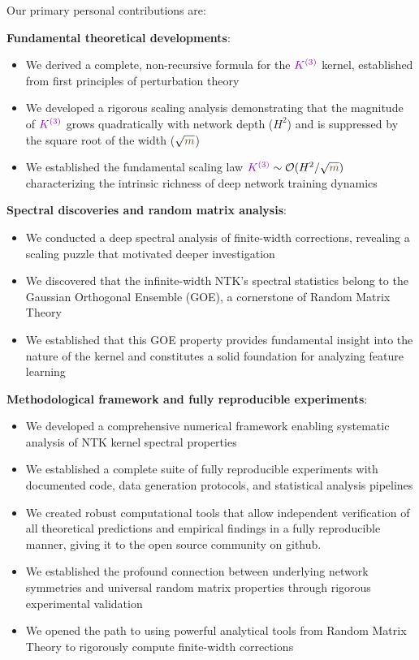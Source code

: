 \documentclass[a4paper]{article}
\newcommand{\m}{\textcolor{weightcolor}{m}}
\theoremstyle{plain}
\theoremstyle{definition}
\theoremstyle{remark}
\begin{document}
Our primary personal contributions are:

\textbf{Fundamental theoretical developments}:
\begin{itemize}
    \item We derived a complete, non-recursive formula for the $\textcolor{k3color}{K^{(3)}}$ kernel, established from first principles of perturbation theory
    \item We developed a rigorous scaling analysis demonstrating that the magnitude of $\textcolor{k3color}{K^{(3)}}$ grows quadratically with network depth ($H^2$) and is suppressed by the square root of the width ($\sqrt{\m}$)
    \item We established the fundamental scaling law $\textcolor{k3color}{K^{(3)}} \sim \mathcal{O}(H^2/\sqrt{\m})$ characterizing the intrinsic richness of deep network training dynamics
\end{itemize}

\textbf{Spectral discoveries and random matrix analysis}:
\begin{itemize}
    \item We conducted a deep spectral analysis of finite-width corrections, revealing a scaling puzzle that motivated deeper investigation
    \item We discovered that the infinite-width NTK's spectral statistics belong to the Gaussian Orthogonal Ensemble (GOE), a cornerstone of Random Matrix Theory
    \item We established that this GOE property provides fundamental insight into the nature of the kernel and constitutes a solid foundation for analyzing feature learning
\end{itemize}

\textbf{Methodological framework and fully reproducible experiments}:
\begin{itemize}
    \item We developed a comprehensive numerical framework enabling systematic analysis of NTK kernel spectral properties
    \item We established a complete suite of fully reproducible experiments with documented code, data generation protocols, and statistical analysis pipelines
    \item We created robust computational tools that allow independent verification of all theoretical predictions and empirical findings in a fully reproducible manner, giving it to the open source community on github.
    \item We established the profound connection between underlying network symmetries and universal random matrix properties through rigorous experimental validation
    \item We opened the path to using powerful analytical tools from Random Matrix Theory to rigorously compute finite-width corrections
\end{itemize}
\end{document}
